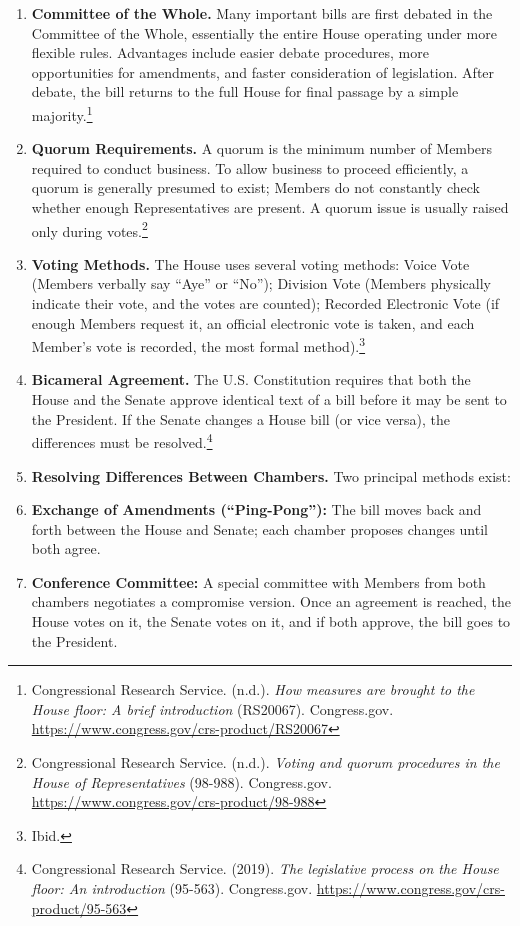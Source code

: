 \begin{enumerate}
  \item \textbf{Committee of the Whole.} Many important bills are first debated in the Committee of the Whole, essentially the entire House operating under more flexible rules. Advantages include easier debate procedures, more opportunities for amendments, and faster consideration of legislation. After debate, the bill returns to the full House for final passage by a simple majority.\footnote{Congressional Research Service. (n.d.). \emph{How measures are brought to the House floor: A brief introduction} (RS20067). Congress.gov. \url{https://www.congress.gov/crs-product/RS20067}}
  \item \textbf{Quorum Requirements.} A quorum is the minimum number of Members required to conduct business. To allow business to proceed efficiently, a quorum is generally presumed to exist; Members do not constantly check whether enough Representatives are present. A quorum issue is usually raised only during votes.\footnote{Congressional Research Service. (n.d.). \emph{Voting and quorum procedures in the House of Representatives} (98-988). Congress.gov. \url{https://www.congress.gov/crs-product/98-988}}
  \item \textbf{Voting Methods.} The House uses several voting methods: Voice Vote (Members verbally say “Aye” or “No”); Division Vote (Members physically indicate their vote, and the votes are counted); Recorded Electronic Vote (if enough Members request it, an official electronic vote is taken, and each Member’s vote is recorded, the most formal method).\footnote{Ibid.}
  \item \textbf{Bicameral Agreement.} The U.S. Constitution requires that both the House and the Senate approve identical text of a bill before it may be sent to the President. If the Senate changes a House bill (or vice versa), the differences must be resolved.\footnote{Congressional Research Service. (2019). \emph{The legislative process on the House floor: An introduction} (95-563). Congress.gov. \url{https://www.congress.gov/crs-product/95-563}}
  \item \textbf{Resolving Differences Between Chambers.} Two principal methods exist:
  \item \textbf{Exchange of Amendments (“Ping-Pong”):} The bill moves back and forth between the House and Senate; each chamber proposes changes until both agree.
  \item \textbf{Conference Committee:} A special committee with Members from both chambers negotiates a compromise version. Once an agreement is reached, the House votes on it, the Senate votes on it, and if both approve, the bill goes to the President.
\end{enumerate}

